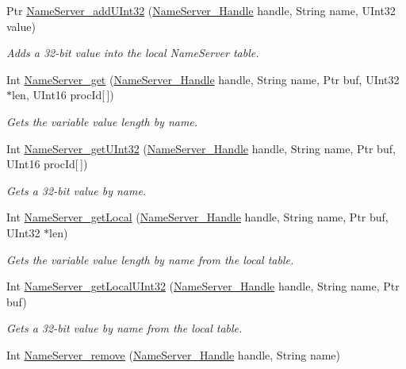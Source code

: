 \begin{DoxyCompactItemize}
Ptr \hyperlink{_name_server_8h_ac130195a04a34dfa2daba6ec3fff65d6}{Name\-Server\-\_\-add\-U\-Int32} (\hyperlink{_name_server_8h_a99fa93c4ee4169db90162b523d9152d4}{Name\-Server\-\_\-\-Handle} handle, String name, U\-Int32 value)
\begin{DoxyCompactList}\small\item\em Adds a 32-\/bit value into the local Name\-Server table. \end{DoxyCompactList}\item 
Int \hyperlink{_name_server_8h_a5f1013e57e7c5da9f003063d70a76e01}{Name\-Server\-\_\-get} (\hyperlink{_name_server_8h_a99fa93c4ee4169db90162b523d9152d4}{Name\-Server\-\_\-\-Handle} handle, String name, Ptr buf, U\-Int32 $\ast$len, U\-Int16 proc\-Id\mbox{[}$\,$\mbox{]})
\begin{DoxyCompactList}\small\item\em Gets the variable value length by name. \end{DoxyCompactList}\item 
Int \hyperlink{_name_server_8h_ac3b6fa4f8f0ed572f1a5f6b7cb05679e}{Name\-Server\-\_\-get\-U\-Int32} (\hyperlink{_name_server_8h_a99fa93c4ee4169db90162b523d9152d4}{Name\-Server\-\_\-\-Handle} handle, String name, Ptr buf, U\-Int16 proc\-Id\mbox{[}$\,$\mbox{]})
\begin{DoxyCompactList}\small\item\em Gets a 32-\/bit value by name. \end{DoxyCompactList}\item 
Int \hyperlink{_name_server_8h_a46d3826bc4ef4bc6cc45d5287c697122}{Name\-Server\-\_\-get\-Local} (\hyperlink{_name_server_8h_a99fa93c4ee4169db90162b523d9152d4}{Name\-Server\-\_\-\-Handle} handle, String name, Ptr buf, U\-Int32 $\ast$len)
\begin{DoxyCompactList}\small\item\em Gets the variable value length by name from the local table. \end{DoxyCompactList}\item 
Int \hyperlink{_name_server_8h_a9e824f111db640d1bce81bfe25963b76}{Name\-Server\-\_\-get\-Local\-U\-Int32} (\hyperlink{_name_server_8h_a99fa93c4ee4169db90162b523d9152d4}{Name\-Server\-\_\-\-Handle} handle, String name, Ptr buf)
\begin{DoxyCompactList}\small\item\em Gets a 32-\/bit value by name from the local table. \end{DoxyCompactList}\item 
Int \hyperlink{_name_server_8h_ab21d262bcfa187f21e235b36ce17d6de}{Name\-Server\-\_\-remove} (\hyperlink{_name_server_8h_a99fa93c4ee4169db90162b523d9152d4}{Name\-Server\-\_\-\-Handle} handle, String name)

\end{DoxyCompactItemize}
